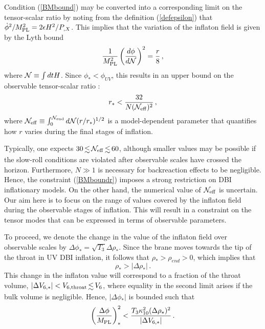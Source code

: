 Condition (\ref{BMbound}) may be converted into a 
corresponding limit on the tensor-scalar ratio by noting from 
the definition (\ref{defepsilon})
that $\dot{\phi}^2 /M_{\mathrm{PL}}^2 = 2\epsilon H^2/P_{,X}$.
This implies that the variation of the inflaton field 
is given by the Lyth bound 
\cite{lyth,bmpaper}
\begin{equation}
\label{rtheory}
\frac{1}{M_{\mathrm{PL}}^2} \left( \frac{d\phi}{d {\cal{N}}} \right)^2 =
\frac{r}{8} \,,
\end{equation}
where ${\cal{N}} \equiv \int dt H$. 
Since $\phi_* < \phi_{UV}$, this 
results in an upper bound on the observable tensor-scalar ratio
\cite{bmpaper}: 
\begin{equation}
\label{BMboundr}
r_*  < \frac{32}{N ({\cal{N}}_{\mathrm{eff}})^2} \,,
\end{equation}
where ${\cal{N}}_{\mathrm{eff}} \equiv 
\int^{{\cal{N}}_{\mathrm{end}}}_0 d {\cal{N}} (r/r_*)^{1/2}$ 
is a model-dependent parameter that quantifies 
how $r$ varies during the final stages of inflation.  

Typically, one expects $30 \, \lsim \, {{\cal{N}}_{\mathrm{eff}}} 
\, \lsim \, 60$, 
although smaller values may be possible if the slow-roll conditions are 
violated after observable scales have crossed the horizon. %
Furthermore, $N \gg 1$ is necessary 
for backreaction effects to be negligible. %
 Hence, the 
constraint (\ref{BMboundr}) 
imposes a strong restriction on DBI inflationary models. 
On the other hand, the numerical value 
of ${\cal{N}}_{\mathrm{eff}}$ is uncertain.  
Our aim here is to focus on the range of values covered by the 
inflaton field during the observable stages of inflation. 
This will result in a constraint on the tensor modes that 
can be expressed in terms of observable parameters.  

To proceed, we denote the change in the value of the inflaton field over 
observable scales by 
$\Delta  \phi _{*} = \sqrt{T_3} \Delta \rho_{*}$. 
Since the brane moves towards the tip of the throat in 
UV DBI inflation, it follows that $\rho_{*} > \rho_{end} >0$, which 
implies that  
\begin{equation}
\label{importantbound}
\rho_{*} > |\Delta \rho _{*}| \,.
\end{equation}
This change in the inflaton value will correspond 
to a fraction of the throat volume, 
$| \Delta V _{6,*}|  < {V_{6,\mathrm{throat}}} \, \lsim \, {V_6} $,
where equality in the second limit arises if
the bulk volume is negligible. Hence, 
$| \Delta \phi_* |$ is bounded such that  
\begin{equation}
\label{halfwayconstraint}
\left( \frac{\Delta \phi}{M_{\mathrm{PL}}} \right)^2_{*} < 
\frac{T_3 \kappa_{10}^2 (\Delta \rho_{*})^2}{|\Delta V_{6,*}|} \,.
\end{equation} 

